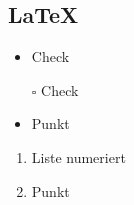 \documentclass[a4paper,12pt,fleqn,parskip=half]{scrartcl}
\title{\thema}
\author{\name}
\date{\today}
\begin{document}

\subsection*{\LaTeX}%

\begin{itemize}[label=\checkmark] %
	\item Check
\end{itemize}

\begin{itemize} 
	\item [$\square$] Check
\end{itemize}

\begin{itemize} 
	\item Punkt
\end{itemize}
\begin{enumerate} 
	\item Liste numeriert
	\item Punkt
\end{enumerate}
\end{document}
